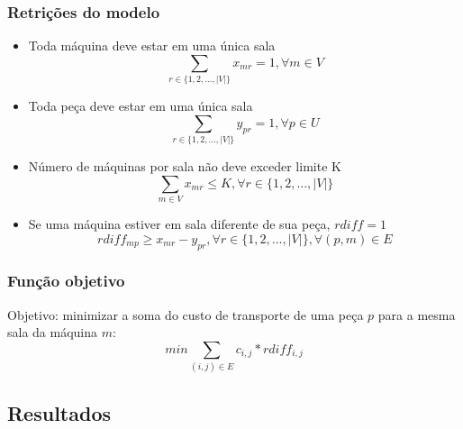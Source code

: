 \documentclass[11pt,letterpaper]{article}
\begin{document}
\subsubsection*{Retrições do modelo}
\begin{itemize}
\item Toda máquina deve estar em uma única sala
\begin{equation*}
  \sum_{r \in  \{1,2,...,|V|\}}x_{mr}=1, \forall m \in V
\end{equation*}

\item Toda peça deve estar em uma única sala
\begin{equation*}
  \sum_{r \in  \{1,2,...,|V|\}}y_{pr}=1, \forall p \in U
\end{equation*}

\item Número de máquinas por sala não deve exceder limite K
\begin{equation*}
  \sum_{m \in V }x_{mr}\leq K, \forall r \in \{1,2,...,|V|\}
\end{equation*}

\item Se uma máquina estiver em sala diferente de sua peça, $rdiff=1$
\begin{equation*}
  rdiff_{mp}\geq x_{mr}-y_{pr}, \forall r \in \{1,2,...,|V|\}, \forall (p,m) \in E
\end{equation*}

\end{itemize}

\subsubsection*{Função objetivo}
Objetivo: minimizar a soma do custo de transporte de uma peça $p$ para
a mesma sala da máquina $m$:
\begin{equation}
min\sum_{(i,j) \in E}c_{i,j}*rdiff_{i,j}
\end{equation}



\subsection{Resultados}


\addtocounter{footnote}{1}
\end{document}
